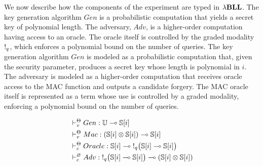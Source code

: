 We now describe how the components of the experiment are typed in ${\lambda}\mathbf{BLL}$. The key generation algorithm $Gen$ is a probabilistic computation that yields a secret key of polynomial length. The adversary, $Adv$, is a higher-order computation having access to an oracle. The oracle itself is controlled by the graded modality $\mathord{!}_q$, which enforces a polynomial bound on the number of queries.
The key generation algorithm $Gen$ is modeled as a probabilistic computation that,
given the security parameter, produces a secret key whose length is polynomial in $i$. The adversary is modeled as a higher-order computation that receives oracle access to the MAC function and outputs a candidate forgery. The MAC oracle itself is represented as a term whose use is controlled by a graded modality, enforcing a polynomial bound on the number of queries.

\begin{align*}
&\vdash_v^\Theta Gen: \mathbb{U} \multimap \mathbb{S}[i] \\
&\vdash_v^\Theta Mac: (\mathbb{S}[i] \otimes \mathbb{S}[i]) \multimap \mathbb{S}[i] \\
&\vdash_c^\Theta Oracle: \mathbb{S}[i] \multimap \mathord{!}_{q}\bigl(\mathbb{S}[i] \multimap \mathbb{S}[i]\bigr)\\
&\vdash_c^\varnothing Adv: \mathord{!}_{q}\bigl(\mathbb{S}[i] \multimap \mathbb{S}[i]\bigr) \multimap (\mathbb{S}[i] \otimes \mathbb{S}[i])
\end{align*}

